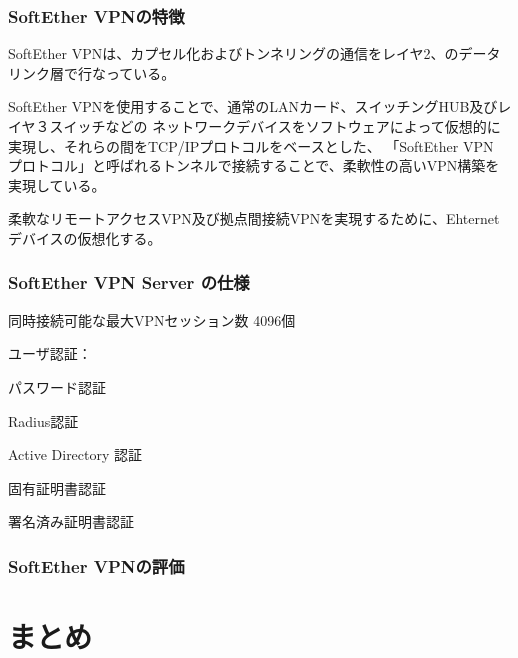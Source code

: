 \documentclass[12pt,a4paper,titlepage]{jreport}
\begin{document}
\subsection*{SoftEther VPNの特徴}
SoftEther VPNは、カプセル化およびトンネリングの通信をレイヤ2、のデータリンク層で行なっている。

SoftEther VPNを使用することで、通常のLANカード、スイッチングHUB及びレイヤ３スイッチなどの
ネットワークデバイスをソフトウェアによって仮想的に実現し、それらの間をTCP/IPプロトコルをベースとした、
「SoftEther VPN プロトコル」と呼ばれるトンネルで接続することで、柔軟性の高いVPN構築を実現している。


柔軟なリモートアクセスVPN及び拠点間接続VPNを実現するために、Ehternetデバイスの仮想化する。

\subsection*{SoftEther VPN Server の仕様}

同時接続可能な最大VPNセッション数
4096個





ユーザ認証：

パスワード認証

Radius認証

Active Directory 認証

固有証明書認証

署名済み証明書認証






\subsection*{SoftEther VPNの評価}




\chapter{まとめ}




\end{document}
